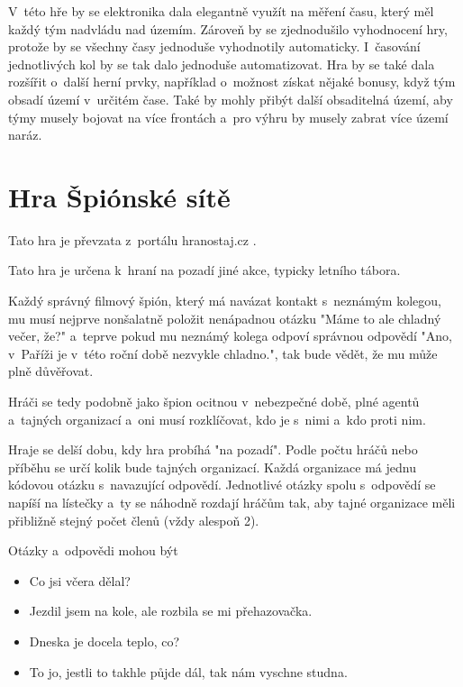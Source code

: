 V~této hře by se elektronika dala elegantně využít na měření času, který měl každý tým nadvládu nad územím.
Zároveň by se zjednodušilo vyhodnocení hry, protože by se všechny časy jednoduše vyhodnotily automaticky.
I~časování jednotlivých kol by se tak dalo jednoduše automatizovat.
Hra by se také dala rozšířit o~další herní prvky, například o~možnost získat nějaké bonusy, když tým obsadí území v~určitém čase.
Také by mohly přibýt další obsaditelná území, aby týmy musely bojovat na více frontách a~pro výhru by musely zabrat více území naráz.

\section{Hra Špiónské sítě \label{SpionskeSite}}
Tato hra je převzata z~portálu hranostaj.cz \cite{SpionskeSite}.

Tato hra je určena k~hraní na pozadí jiné akce, typicky letního tábora.

Každý správný filmový špión, který má navázat kontakt s~neznámým kolegou, mu musí nejprve nonšalatně položit nenápadnou otázku "Máme to ale chladný večer, že?" a~teprve pokud mu neznámý kolega odpoví správnou odpovědí "Ano, v~Paříži je v~této roční době nezvykle chladno.", tak bude vědět, že mu může plně důvěřovat.

Hráči se tedy podobně jako špion ocitnou v~nebezpečné době, plné agentů a~tajných organizací a~oni musí rozklíčovat, kdo je s~nimi a~kdo proti nim.

Hraje se delší dobu, kdy hra probíhá "na pozadí". Podle počtu hráčů nebo příběhu se určí kolik bude tajných organizací. Každá organizace má jednu kódovou otázku s~navazující odpovědí. Jednotlivé otázky spolu s~odpovědí se napíší na lístečky a~ty se náhodně rozdají hráčům tak, aby tajné organizace měli přibližně stejný počet členů (vždy alespoň 2).

Otázky a~odpovědi mohou být
\begin{itemize}
    \item Co jsi včera dělal?
    \item Jezdil jsem na kole, ale rozbila se mi přehazovačka.
\end{itemize}

\begin{itemize}
    \item Dneska je docela teplo, co?
    \item To jo, jestli to takhle půjde dál, tak nám vyschne studna.
\end{itemize}

